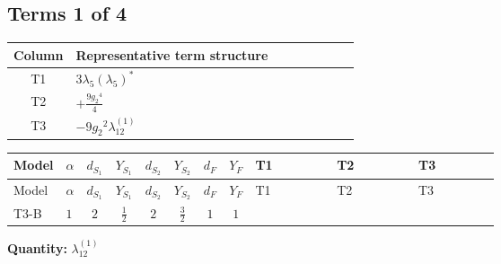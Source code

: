 \documentclass[8pt]{article}
\begin{document}
\begin{landscape}
\subsection*{Terms 1 of 4}
\begin{center}
\begin{tabular}{@{}c >{\raggedright\arraybackslash}p{0.82\linewidth}@{}}
\toprule
Column & Representative term structure \\
\midrule
T1 & \(\displaystyle 3 {\lambda_5} \left({\lambda_5}\right)^{*}\) \\
\midrule
T2 & \(\displaystyle +\frac{9 {g_2}^4}{4}\) \\
\midrule
T3 & \(\displaystyle -9 {g_2}^2 {\lambda_{12}^{(1)}}\) \\
\midrule
\bottomrule
\end{tabular}
\end{center}
\smallskip
\tiny
\begin{longtable}{@{}llcccccc >{\raggedright\arraybackslash}p{0.21\linewidth} >{\raggedright\arraybackslash}p{0.21\linewidth} >{\raggedright\arraybackslash}p{0.21\linewidth}@{}}
\toprule
Model & $\alpha$ & $d_{S_1}$ & $Y_{S_1}$ & $d_{S_2}$ & $Y_{S_2}$ & $d_F$ & $Y_F$ & T1 & T2 & T3 \\
\midrule
\endfirsthead
\toprule
Model & $\alpha$ & $d_{S_1}$ & $Y_{S_1}$ & $d_{S_2}$ & $Y_{S_2}$ & $d_F$ & $Y_F$ & T1 & T2 & T3 \\
\midrule
\endhead
T3-B & $1$ & $2$ & $\frac{1}{2}$ & $2$ & $\frac{3}{2}$ & $1$ & $1$ & \scriptsize\adjustbox{max width=\linewidth}{$\begin{gathered} 3 {\lambda_5} \left({\lambda_5}\right)^{*}\end{gathered}$} & \scriptsize\adjustbox{max width=\linewidth}{$\begin{gathered} +\frac{9 {g_2}^4}{4}\end{gathered}$} & \scriptsize\adjustbox{max width=\linewidth}{$\begin{gathered} -9 {g_2}^2 {\lambda_{12}^{(1)}}\end{gathered}$} \\
\midrule
\bottomrule
\end{longtable}
\clearpage
\noindent\textbf{Quantity: }$\lambda_{12}^{(1)}$\par\smallskip

\end{landscape}
\end{document}
